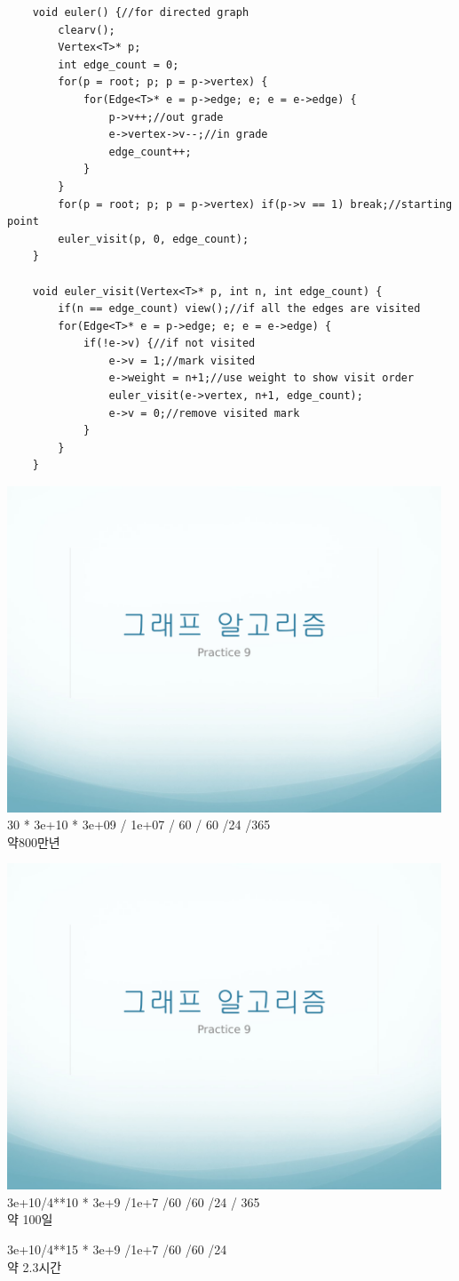 \documentclass[12pt,a4paper]{article}
\begin{document}
\begin{lstlisting}
	void euler() {//for directed graph
		clearv();
		Vertex<T>* p;
		int edge_count = 0;
		for(p = root; p; p = p->vertex) {
			for(Edge<T>* e = p->edge; e; e = e->edge) {
				p->v++;//out grade
				e->vertex->v--;//in grade
				edge_count++;
			}
		}
		for(p = root; p; p = p->vertex) if(p->v == 1) break;//starting point
		euler_visit(p, 0, edge_count);
	}
	
	void euler_visit(Vertex<T>* p, int n, int edge_count) {
		if(n == edge_count) view();//if all the edges are visited
		for(Edge<T>* e = p->edge; e; e = e->edge) {
			if(!e->v) {//if not visited
				e->v = 1;//mark visited
				e->weight = n+1;//use weight to show visit order
				euler_visit(e->vertex, n+1, edge_count);
				e->v = 0;//remove visited mark
			}
		}
	}
\end{lstlisting}
\includegraphics[page=5, width=0.97\textwidth]{1.pdf}
30 * 3e+10 * 3e+09 / 1e+07 / 60 / 60 /24 /365\\
약800만년 

\includegraphics[page=6, width=0.97\textwidth]{1.pdf}
3e+10/4**10 * 3e+9 /1e+7 /60 /60 /24 / 365\\
약 100일

3e+10/4**15 * 3e+9 /1e+7 /60 /60 /24 \\
약 2.3시간


\end{document}
